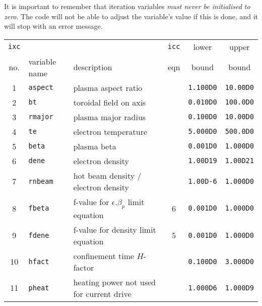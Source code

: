\documentclass[11pt,a4paper]{report}
\begin{document}
It is important to remember that iteration variables \textit{must never be
initialised to zero}. The code will not be able to adjust the variable's value
if this is done, and it will stop with an error message.


\begin{table}[tbph]
\footnotesize
\begin{center}

\begin{tabular}{||c|l|l|c|c|c||} \hline
\texttt{ixc} &          &                                               & \texttt{icc} & lower        & upper       \\
no. & variable name     & description                                   & eqn & bound        & bound       \\ \hline
1   & \texttt{aspect}   & plasma aspect ratio                           &     & \texttt{1.100D0} & \texttt{10.00D0} \\
2   & \texttt{bt}       & toroidal field on axis                        &     & \texttt{0.010D0} & \texttt{100.0D0} \\
3   & \texttt{rmajor}   & plasma major radius                           &     & \texttt{0.100D0} & \texttt{10.00D0} \\
4   & \texttt{te}       & electron temperature                          &     & \texttt{5.000D0} & \texttt{500.0D0} \\
5   & \texttt{beta}     & plasma beta                                   &     & \texttt{0.001D0} & \texttt{1.000D0} \\
6   & \texttt{dene}     & electron density                              &     & \texttt{1.00D19} & \texttt{1.00D21} \\
7   & \texttt{rnbeam}   & hot beam density / electron density           &     & \texttt{1.00D-6} & \texttt{1.000D0} \\
8   & \texttt{fbeta}    & f-value for $\epsilon.\beta_p$ limit equation & 6   & \texttt{0.001D0} & \texttt{1.000D0} \\
9   & \texttt{fdene}    & f-value for density limit equation            & 5   & \texttt{0.001D0} & \texttt{1.000D0} \\
10  & \texttt{hfact}    & confinement time $H$-factor                   &     & \texttt{0.100D0} & \texttt{3.000D0} \\
11  & \texttt{pheat}    & heating power not used for current drive      &     & \texttt{1.000D6} & \texttt{1.000D9} \\

\end{tabular}
\end{center}
\end{table}
\end{document}

